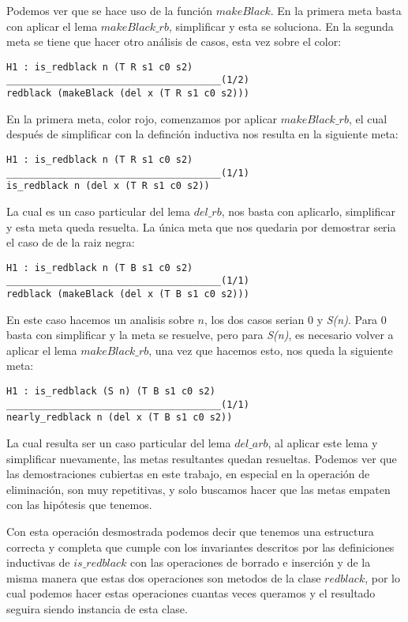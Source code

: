 Podemos ver que se hace uso de la funci\'on $makeBlack$. En la primera meta basta con aplicar el
lema $makeBlack\_rb$, simplificar y esta se soluciona. En la segunda meta se tiene que hacer otro
an\'alisis de casos, esta vez sobre el color:

\begin{verbatim}
H1 : is_redblack n (T R s1 c0 s2)
______________________________________(1/2)
redblack (makeBlack (del x (T R s1 c0 s2)))

\end{verbatim}

En la primera meta, color rojo, comenzamos por aplicar $makeBlack\_rb$, el cual despu\'es de
simplificar con la definci\'on inductiva nos resulta en la siguiente meta:

\begin{verbatim}
H1 : is_redblack n (T R s1 c0 s2)
______________________________________(1/1)
is_redblack n (del x (T R s1 c0 s2))
\end{verbatim}

La cual es un caso particular del lema $del\_rb$, nos basta con aplicarlo, simplificar y esta meta
queda resuelta. La \'unica meta que nos quedaria por demostrar seria el caso de de la raiz negra:

\begin{verbatim}
H1 : is_redblack n (T B s1 c0 s2)
______________________________________(1/1)
redblack (makeBlack (del x (T B s1 c0 s2)))
\end{verbatim}

En este caso hacemos un analisis sobre $n$, los dos casos serian 0 y \textit{S(n)}. Para 0 basta
con simplificar y la meta se resuelve, pero para \textit{S(n)}, es necesario volver a aplicar el
lema $makeBlack\_rb$, una vez que hacemos esto, nos queda la siguiente meta:

\begin{verbatim}
H1 : is_redblack (S n) (T B s1 c0 s2)
______________________________________(1/1)
nearly_redblack n (del x (T B s1 c0 s2))
\end{verbatim}

La cual resulta ser un caso particular del lema $del\_arb$, al aplicar este lema y simplificar
nuevamente, las metas resultantes quedan resueltas. Podemos ver que las demostraciones cubiertas en
este trabajo, en especial en la operaci\'on de eliminación, son muy repetitivas, y solo buscamos
hacer que las metas empaten con las hip\'otesis que tenemos.

Con esta operaci\'on desmostrada podemos decir que tenemos una estructura correcta y completa que
cumple con los invariantes descritos por las definiciones inductivas de $is\_redblack$ con las
operaciones de borrado e inserción y de la misma manera que estas dos operaciones son metodos de la
clase $redblack$, por lo cual podemos hacer estas operaciones cuantas veces queramos y el resultado
seguira siendo instancia de esta clase.
